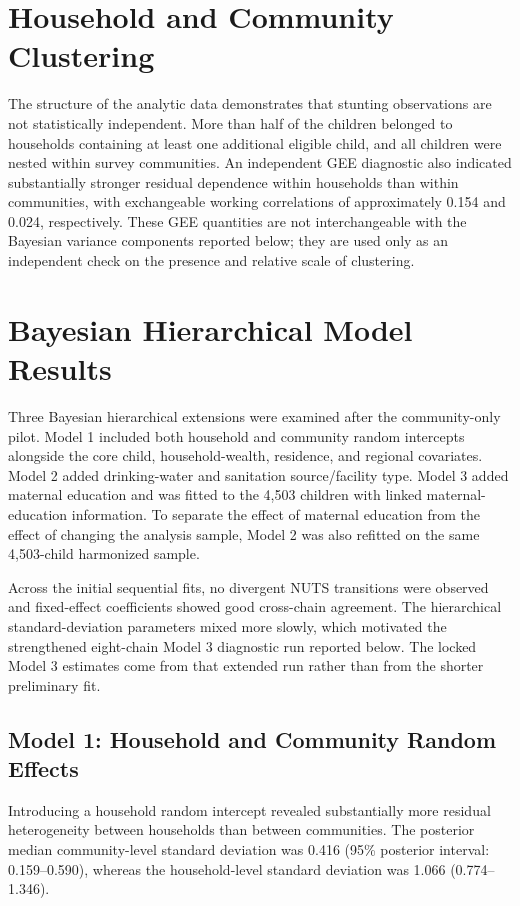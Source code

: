 \section{Household and Community Clustering}

The structure of the analytic data demonstrates that stunting observations are not statistically independent. More than half of the children belonged to households containing at least one additional eligible child, and all children were nested within survey communities. An independent GEE diagnostic also indicated substantially stronger residual dependence within households than within communities, with exchangeable working correlations of approximately 0.154 and 0.024, respectively. These GEE quantities are not interchangeable with the Bayesian variance components reported below; they are used only as an independent check on the presence and relative scale of clustering.

\section{Bayesian Hierarchical Model Results}

Three Bayesian hierarchical extensions were examined after the community-only pilot. Model 1 included both household and community random intercepts alongside the core child, household-wealth, residence, and regional covariates. Model 2 added drinking-water and sanitation source/facility type. Model 3 added maternal education and was fitted to the 4,503 children with linked maternal-education information. To separate the effect of maternal education from the effect of changing the analysis sample, Model 2 was also refitted on the same 4,503-child harmonized sample.

Across the initial sequential fits, no divergent NUTS transitions were observed and fixed-effect coefficients showed good cross-chain agreement. The hierarchical standard-deviation parameters mixed more slowly, which motivated the strengthened eight-chain Model 3 diagnostic run reported below. The locked Model 3 estimates come from that extended run rather than from the shorter preliminary fit.

\subsection{Model 1: Household and Community Random Effects}

Introducing a household random intercept revealed substantially more residual heterogeneity between households than between communities. The posterior median community-level standard deviation was 0.416 (95\% posterior interval: 0.159--0.590), whereas the household-level standard deviation was 1.066 (0.774--1.346).

